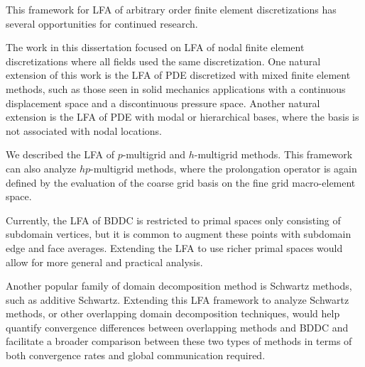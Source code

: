 This framework for LFA of arbitrary order finite element discretizations has several opportunities for continued research.

The work in this dissertation focused on LFA of nodal finite element discretizations where all fields used the same discretization.
One natural extension of this work is the LFA of PDE discretized with mixed finite element methods, such as those seen in solid mechanics applications with a continuous displacement space and a discontinuous pressure space.
Another natural extension is the LFA of PDE with modal or hierarchical bases, where the basis is not associated with nodal locations.

We described the LFA of $p$-multigrid and $h$-multigrid methods.
This framework can also analyze $hp$-multigrid methods, where the prolongation operator is again defined by the evaluation of the coarse grid basis on the fine grid macro-element space.

Currently, the LFA of BDDC is restricted to primal spaces only consisting of subdomain vertices, but it is common to augment these points with subdomain edge and face averages.
Extending the LFA to use richer primal spaces would allow for more general and practical analysis.

Another popular family of domain decomposition method is Schwartz methods, such as additive Schwartz.
Extending this LFA framework to analyze Schwartz methods, or other overlapping domain decomposition techniques, would help quantify convergence differences between overlapping methods and BDDC and facilitate a broader comparison between these two types of methods in terms of both convergence rates and global communication required.
